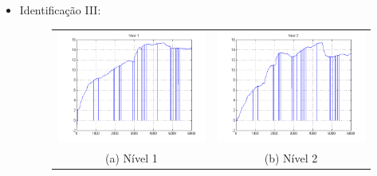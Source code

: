 \begin{itemize}
\newpage \item Identificação III:
\begin{figure}[H]
	\centering
	\begin{tabular}{cc}
		\includegraphics[height=0.15\paperheight,keepaspectratio]{img/sim3_h1.png} &
		\includegraphics[height=0.15\paperheight,keepaspectratio]{img/sim3_h2.png} \\
		(a) Nível 1 &
		(b) Nível 2 \\

\end{tabular}
\end{figure}
\end{itemize}

